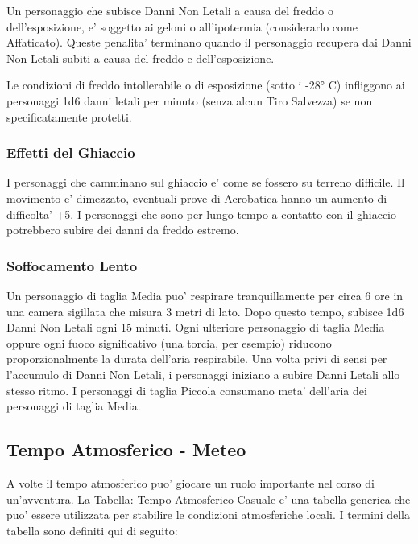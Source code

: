 \documentclass[a4paper,11pt,twoside,openany]{book}
\begin{document}
{Un personaggio che subisce Danni Non Letali a causa del freddo o dell'esposizione, e' soggetto ai geloni o all'ipotermia (considerarlo come Affaticato). Queste penalita' terminano quando il personaggio recupera dai Danni Non Letali subiti a causa del freddo e dell'esposizione. 

Le condizioni di freddo intollerabile o di esposizione (sotto i -28° C) infliggono ai personaggi 1d6 danni letali per minuto (senza alcun Tiro Salvezza) se non specificatamente protetti.

\subsubsection{Effetti del Ghiaccio}

I personaggi che camminano sul ghiaccio e' come se fossero su terreno difficile. Il movimento e' dimezzato, eventuali prove di Acrobatica hanno un aumento di difficolta' +5. I personaggi che sono per lungo tempo a contatto con il ghiaccio potrebbero subire dei danni da freddo estremo.

\subsubsection{Soffocamento Lento}

Un personaggio di taglia Media puo' respirare tranquillamente per circa 6 ore in una camera sigillata che misura 3 metri di lato. Dopo questo tempo, subisce 1d6 Danni Non Letali ogni 15 minuti. Ogni ulteriore personaggio di taglia Media oppure ogni fuoco significativo (una torcia, per esempio) riducono proporzionalmente la durata dell'aria respirabile. Una volta privi di sensi per l'accumulo di Danni Non Letali, i personaggi iniziano a subire Danni Letali allo stesso ritmo. I personaggi di taglia Piccola consumano meta' dell'aria dei personaggi di taglia Media.

\pagebreak

\subsection{Tempo Atmosferico - Meteo}

\label{tempo-atmosferico---meteo}

A volte il tempo atmosferico puo' giocare un ruolo importante nel corso di un'avventura. La Tabella: Tempo Atmosferico Casuale e' una tabella generica che puo' essere utilizzata per stabilire le condizioni atmosferiche locali. I termini della tabella sono definiti qui di seguito:

}
\end{document}
